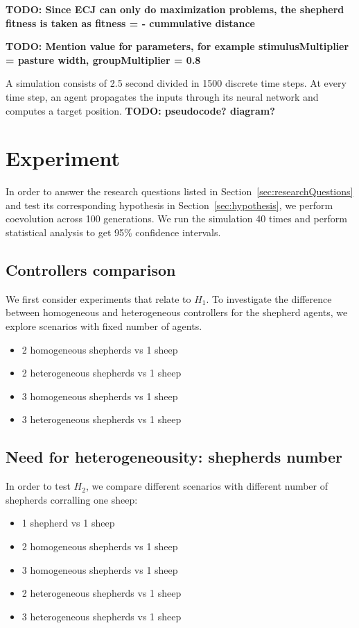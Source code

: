 \documentclass[conference]{IEEEtran}
\begin{document}
\textbf{TODO: Since ECJ can only do maximization problems, the shepherd fitness is taken as 
fitness = - cummulative distance}

\textbf{TODO: Mention value for parameters, for example stimulusMultiplier = pasture width, groupMultiplier = 0.8}

A simulation consists of 2.5 second divided in 1500 discrete time steps. At every time step, an agent propagates the inputs through its neural network and computes a target position.
\textbf{TODO: pseudocode? diagram?}
 



\section{Experiment}
\label{sec:experiment}
In order to answer the research questions listed in Section~\ref{sec:researchQuestions} and test its corresponding hypothesis in Section~\ref{sec:hypothesis}, we perform coevolution across 100 generations. 
We run the simulation 40 times and perform statistical analysis to get 95\% confidence intervals.

\subsection{Controllers comparison}
We first consider experiments that relate to $H_1$. To investigate the difference between homogeneous and heterogeneous controllers for the shepherd agents, we explore scenarios with fixed number of agents. 
\begin{itemize}
	\item 2 homogeneous shepherds vs 1 sheep
	\item 2 heterogeneous shepherds vs 1 sheep
	\item 3 homogeneous shepherds vs 1 sheep
	\item 3 heterogeneous shepherds vs 1 sheep
\end{itemize}

\subsection{Need for heterogeneousity: shepherds number}
In order to test $H_2$, we compare different scenarios with different number of shepherds corralling one sheep:
\begin{itemize}
	\item 1 shepherd vs 1 sheep	
	\item 2 homogeneous shepherds vs 1 sheep
	\item 3 homogeneous shepherds vs 1 sheep
	\item 2 heterogeneous shepherds vs 1 sheep
	\item 3 heterogeneous shepherds vs 1 sheep
	
\end{itemize}
\end{document}
